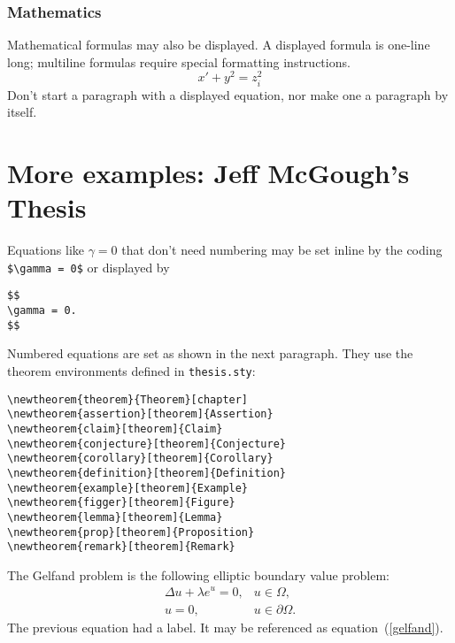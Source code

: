 \subsubsection{Mathematics}
Mathematical formulas may also be displayed.  A displayed formula is
one-line long; multiline formulas require special formatting
instructions.
   \[  x' + y^{2} = z_{i}^{2}\]
Don't start a paragraph with a displayed equation, nor make
one a paragraph by itself.

\section{More examples: Jeff McGough's Thesis}

Equations like
$\gamma = 0$ that don't need numbering may
be
set inline by the coding \verb"$\gamma = 0$" or displayed by
\par
\begin{verbatim}
$$
\gamma = 0.
$$
\end{verbatim}
\par
Numbered equations are set as shown in the next paragraph. They use the
theorem environments defined in \verb"thesis.sty":
\par
\begin{verbatim}
\newtheorem{theorem}{Theorem}[chapter]
\newtheorem{assertion}[theorem]{Assertion}
\newtheorem{claim}[theorem]{Claim}
\newtheorem{conjecture}[theorem]{Conjecture}
\newtheorem{corollary}[theorem]{Corollary}
\newtheorem{definition}[theorem]{Definition}
\newtheorem{example}[theorem]{Example}
\newtheorem{figger}[theorem]{Figure}
\newtheorem{lemma}[theorem]{Lemma}
\newtheorem{prop}[theorem]{Proposition}
\newtheorem{remark}[theorem]{Remark}
\end{verbatim}
\par

The Gelfand problem is the following elliptic boundary value problem:
%
%
\def\dd{\displaystyle}
\begin{equation}\label{gelfand}
\begin{array}{rl}
\dd \Delta u + \lambda e^u = 0, &
\dd u\in \Omega,\\[8pt] %
\dd u=0, & \dd u\in\partial\Omega.
\end{array}
\end{equation}
The previous equation had a label.  It may be referenced as
equation~(\ref{gelfand}).

